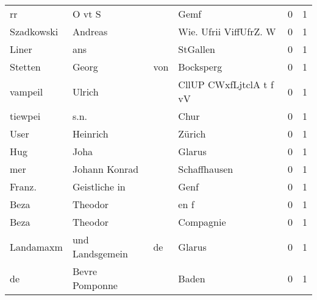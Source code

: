 \begin{center}
\begin{tiny}
\begin{longtabu}{llllrr}
                       rr &                             O vt S &             &                                        Gemf &          0 &         1 \\
               Szadkowski &                            Andreas &             &                      Wie. Ufrii ViffUfrZ. W &          0 &         1 \\
                    Liner &                                ans &             &                                    StGallen &          0 &         1 \\
                  Stetten &                              Georg &         von &                                   Bocksperg &          0 &         1 \\
                  vampeil &                             Ulrich &             &                     CllUP CWxfLjtclA t f vV &          0 &         1 \\
                  tiewpei &                               s.n. &             &                                        Chur &          0 &         1 \\
                     User &                           Heinrich &             &                                      Zürich &          0 &         1 \\
                      Hug &                               Joha &             &                                      Glarus &          0 &         1 \\
                      mer &                      Johann Konrad &             &                                Schaffhausen &          0 &         1 \\
                   Franz. &                      Geistliche in &             &                                        Genf &          0 &         1 \\
                     Beza &                            Theodor &             &                                        en f &          0 &         1 \\
                     Beza &                            Theodor &             &                                   Compagnie &          0 &         1 \\
                Landamaxm &                    und Landsgemein &          de &                                      Glarus &          0 &         1 \\
                       de &                     Bevre Pomponne &             &                                       Baden &          0 &         1 \\

\end{longtabu}
\end{tiny}
\end{center}
